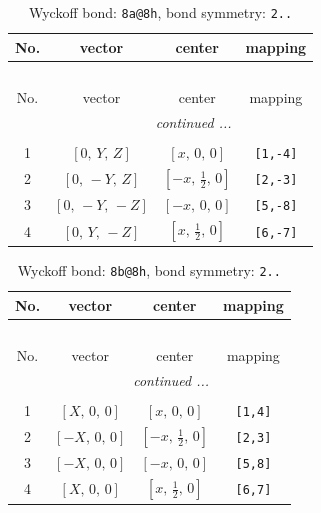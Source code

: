 \documentclass[fleqn,8pt]{jsarticle}
\begin{document}
\begin{longtable}{cccc}
\caption{Wyckoff bond: {\tt 8a@8h}, bond symmetry: {\tt 2..}}
 \\
 \hline \hline
No. & vector & center & mapping \\ \hline \endfirsthead

\multicolumn{3}{l}{\tablename\ \thetable{}} \\
 \hline \hline
No. & vector & center & mapping \\ \hline \endhead

 \hline \hline
\multicolumn{3}{r}{\footnotesize\it continued ...} \\ \endfoot

 \hline \hline
\multicolumn{3}{r}{} \\ \endlastfoot

1 & $\left[ 0,\, Y,\, Z \right]$ & $\left[ x,\, 0,\, 0 \right]$ & {\tt [1,-4]} \\ \hline
2 & $\left[ 0,\, - Y,\, Z \right]$ & $\left[ - x,\, \frac{1}{2},\, 0 \right]$ & {\tt [2,-3]} \\ \hline
3 & $\left[ 0,\, - Y,\, - Z \right]$ & $\left[ - x,\, 0,\, 0 \right]$ & {\tt [5,-8]} \\ \hline
4 & $\left[ 0,\, Y,\, - Z \right]$ & $\left[ x,\, \frac{1}{2},\, 0 \right]$ & {\tt [6,-7]} \\
\end{longtable}
\renewcommand{\arraystretch}{1.2}
\begin{longtable}{cccc}
\caption{Wyckoff bond: {\tt 8b@8h}, bond symmetry: {\tt 2..}}
 \\
 \hline \hline
No. & vector & center & mapping \\ \hline \endfirsthead

\multicolumn{3}{l}{\tablename\ \thetable{}} \\
 \hline \hline
No. & vector & center & mapping \\ \hline \endhead

 \hline \hline
\multicolumn{3}{r}{\footnotesize\it continued ...} \\ \endfoot

 \hline \hline
\multicolumn{3}{r}{} \\ \endlastfoot

1 & $\left[ X,\, 0,\, 0 \right]$ & $\left[ x,\, 0,\, 0 \right]$ & {\tt [1,4]} \\ \hline
2 & $\left[ - X,\, 0,\, 0 \right]$ & $\left[ - x,\, \frac{1}{2},\, 0 \right]$ & {\tt [2,3]} \\ \hline
3 & $\left[ - X,\, 0,\, 0 \right]$ & $\left[ - x,\, 0,\, 0 \right]$ & {\tt [5,8]} \\ \hline
4 & $\left[ X,\, 0,\, 0 \right]$ & $\left[ x,\, \frac{1}{2},\, 0 \right]$ & {\tt [6,7]} \\
\end{longtable}
\end{document}
